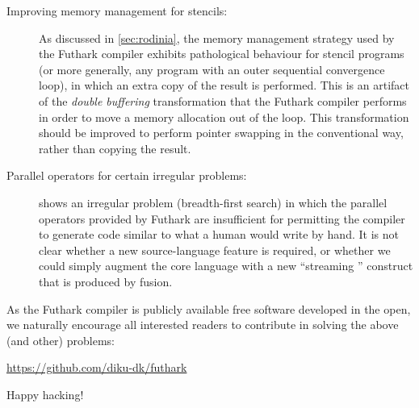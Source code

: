 \begin{description}
\item[Improving memory management for stencils:] As discussed in
  \cref{sec:rodinia}, the memory management strategy used by the
  Futhark compiler exhibits pathological behaviour for stencil
  programs (or more generally, any program with an outer sequential
  convergence loop), in which an extra copy of the result is
  performed.  This is an artifact of the \textit{double buffering}
  transformation that the Futhark compiler performs in order to move a
  memory allocation out of the loop.  This transformation should be
  improved to perform pointer swapping in the conventional way, rather
  than copying the result.

\item[Parallel operators for certain irregular problems:]
   shows an irregular problem
  (breadth-first search) in which the parallel operators provided by
  Futhark are insufficient for permitting the compiler to generate
  code similar to what a human would write by hand.  It is not clear
  whether a new source-language feature is required, or whether we
  could simply augment the core language with a new ``streaming
  '' construct that is produced by fusion.
\end{description}

As the Futhark compiler is publicly available free software developed
in the open, we naturally encourage all interested readers to
contribute in solving the above (and other) problems:

\begin{center}
  \url{https://github.com/diku-dk/futhark}
\end{center}

Happy hacking!

